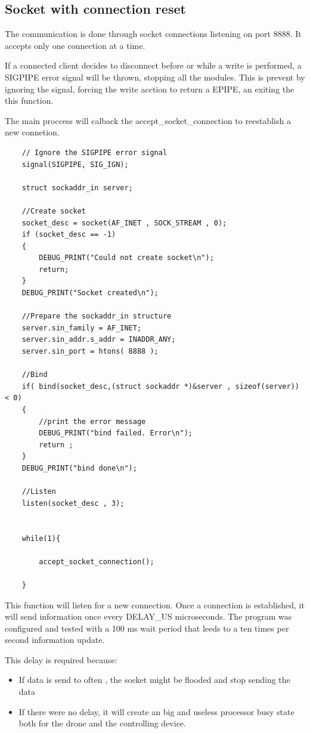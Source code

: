 \subsection{Socket with connection reset}

The communication is done through socket connections listening on port 8888. It accepts only one connection at a time.

If a connected client decides to disconnect before or while a write is performed, a SIGPIPE error signal will be thrown, stopping all the modules. This is prevent by ignoring the signal, forcing the write acction to return a EPIPE, an exiting the this function.

The main proccess will calback the accept\_socket\_connection to reestablish a new connetion.

\lstset{numbers=none, mathescape=true, nolol=false,caption=Data Collection use of mutex,label=lst:task}
\begin{lstlisting}
	// Ignore the SIGPIPE error signal
	signal(SIGPIPE, SIG_IGN);

    struct sockaddr_in server;

    //Create socket
    socket_desc = socket(AF_INET , SOCK_STREAM , 0);
    if (socket_desc == -1)
    {
        DEBUG_PRINT("Could not create socket\n");
		return;
    }
    DEBUG_PRINT("Socket created\n");
     
    //Prepare the sockaddr_in structure
    server.sin_family = AF_INET;
    server.sin_addr.s_addr = INADDR_ANY;
    server.sin_port = htons( 8888 );
     
    //Bind
    if( bind(socket_desc,(struct sockaddr *)&server , sizeof(server)) < 0)
    {
        //print the error message
        DEBUG_PRINT("bind failed. Error\n");
        return ;
    }
    DEBUG_PRINT("bind done\n");
     
    //Listen
    listen(socket_desc , 3);
     

	while(1){
	
		accept_socket_connection();
	
	}
\end{lstlisting}


This function will listen for a new connection. Once a connection is established, it will send information once every DELAY\_US microseconds. The program was configured and tested with a 100 ms wait period that leeds to a ten times per second information update.

This delay is required because:
\begin{itemize}

\item If data is send to often , the socket might be flooded and stop sending the data
\item If there were no delay, it will create an big and useless processor busy state both for the drone and the controlling device.

\end{itemize}

